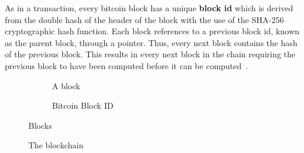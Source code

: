 As in a transaction, every bitcoin block has a unique \textbf{block id} which is derived from the double hash of the header of the block with the use of the SHA-256 cryptographic hash function. Each block references to a previous block id, known as the parent block, through a pointer. Thus, every next block contains the hash of the previous block. This results in every next block in the chain requiring the previous block to have been computed before it can be computed~\cite{zindros_thesis}.

\begin{figure}[ht!]
  \begin{subfigure}[t]{0.50\textwidth}
    \centering
    \caption{A block}
    \label{fig:block:a}
  \end{subfigure}
  \begin{subfigure}[t]{0.50\textwidth}
    \centering
    \caption{Bitcoin Block ID}
    \label{fig:block:b}
  \end{subfigure}
  \caption{Blocks}
  \label{fig:blocks}
\end{figure}

\begin{figure}[ht!]
  \centering
  \caption{The blockchain}
  \label{fig:blockchain}
\end{figure}

